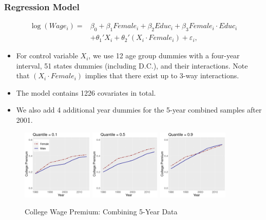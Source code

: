 \documentclass[beamer, t]{beamer}
\newcommand{\bit}{\begin{itemize}}
\newcommand{\eit}{\end{itemize}}
\begin{document}
\begin{frame}
\frametitle{Regression Model}
\begin{footnotesize}
\begin{align*}
    \log(Wage_i) = & \beta_0 + \beta_1 Female_i + \beta_2 Educ_i + \beta_3 Female_i\cdot Educ_i\\ & + \theta_1'X_i + \theta_2' (X_i\cdot Female_i) + \varepsilon_i,
\end{align*}
\end{footnotesize}
	\bit
		\item For control variable $X_i$, we use 12 age group dummies with a four-year interval, 51 states dummies (including D.C.), and their interactions. Note that $(X_i\cdot Female_i)$ implies that there exist up to 3-way interactions. 

		\item The model contains 1226 covariates in total. 

		\item We also add 4 additional year dummies for the 5-year combined samples after 2001. 

		
	\eit

\end{frame}



\begin{frame}
	
	\bigskip
	
	\begin{figure}[!h]
		\centering
		\caption{College Wage Premium: %
			Combining 5-Year Data %
		}
	\bigskip
			\includegraphics[width=0.3\textwidth]{figures/chart_1_03_FullT_5yr.png}  \includegraphics[width=0.3\textwidth]{figures/chart_5_03_FullT_5yr.png} \includegraphics[width=0.3\textwidth]{figures/chart_9_03_FullT_5yr.png} 
			
	\end{figure}
	
\end{frame}
\end{document}
